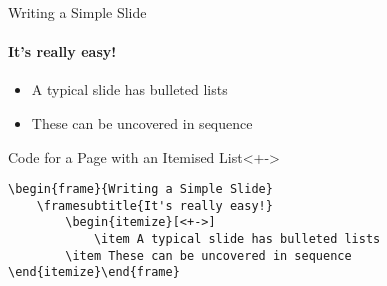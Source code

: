 \begin{frame}[fragile]{Writing a Simple Slide}
\framesubtitle{It's really easy!}
\begin{itemize}[<+->]
    \item A typical slide has bulleted lists
    \item These can be uncovered in sequence
\end{itemize}
\begin{block}{Code for a Page with an Itemised List}<+->
\begin{verbatim}
\begin{frame}{Writing a Simple Slide}
    \framesubtitle{It's really easy!}
        \begin{itemize}[<+->]
            \item A typical slide has bulleted lists
        \item These can be uncovered in sequence
\end{itemize}\end{frame}
\end{verbatim}
\end{block}

\end{frame}